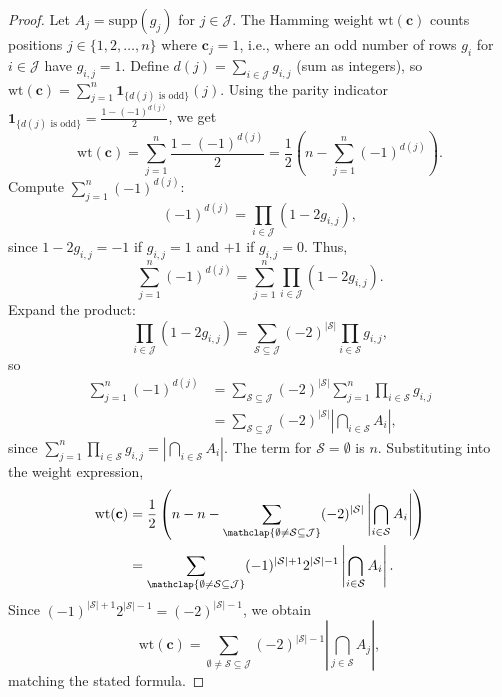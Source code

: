 \documentclass[conference]{IEEEtran}
\theoremstyle{definition}
\begin{document}
\begin{proof}
Let $A_j = \mathrm{supp}(g_j)$ for $j \in \mathcal{J}$. The Hamming weight $\mathrm{wt}(\mathbf{c})$ counts positions $j \in \{1,2,\dots,n\}$ where $\mathbf{c}_j = 1$, i.e., where an odd number of rows $g_i$ for $i \in \mathcal{J}$ have $g_{i,j} = 1$. Define $d(j) = \sum_{i \in \mathcal{J}} g_{i,j}$ (sum as integers), so $\mathrm{wt}(\mathbf{c}) = \sum_{j=1}^n \mathbf{1}_{\{d(j) \text{ is odd}\}}(j)$. Using the parity indicator $\mathbf{1}_{\{d(j) \text{ is odd}\}} = \frac{1 - (-1)^{d(j)}}{2}$, we get
\[
\mathrm{wt}(\mathbf{c}) = \sum_{j=1}^n \frac{1 - (-1)^{d(j)}}{2} = \frac{1}{2} \left( n - \sum_{j=1}^n (-1)^{d(j)} \right).
\]
Compute $\sum_{j=1}^n (-1)^{d(j)}$:
\[
(-1)^{d(j)} = \prod_{i \in \mathcal{J}} (1 - 2 g_{i,j}),
\]
since $1 - 2 g_{i,j} = -1$ if $g_{i,j} = 1$ and $+1$ if $g_{i,j} = 0$. Thus,
\[
\sum_{j=1}^n (-1)^{d(j)} = \sum_{j=1}^n \prod_{i \in \mathcal{J}} (1 - 2 g_{i,j}).
\]
Expand the product:
\[
\prod_{i \in \mathcal{J}} (1 - 2 g_{i,j}) = \sum_{\mathcal{S} \subseteq \mathcal{J}} (-2)^{|\mathcal{S}|} \prod_{i \in \mathcal{S}} g_{i,j},
\]
so
\[
\begin{aligned}
\sum_{j=1}^n (-1)^{d(j)} &= \sum_{\mathcal{S} \subseteq \mathcal{J}} (-2)^{|\mathcal{S}|} \sum_{j=1}^n \prod_{i \in \mathcal{S}} g_{i,j} \\&= \sum_{\mathcal{S} \subseteq \mathcal{J}} (-2)^{|\mathcal{S}|} \left| \bigcap_{i \in \mathcal{S}} A_i \right|,
\end{aligned}
\]
since $\sum_{j=1}^n \prod_{i \in \mathcal{S}} g_{i,j} = |\bigcap_{i \in \mathcal{S}} A_i|$. The term for $\mathcal{S} = \emptyset$ is $n$. Substituting into the weight expression,
\[
\begin{aligned}
\mathrm{wt}(\mathbf{c}) &= \frac{1}{2} \left( n - n - \sum_{\mathclap{\emptyset \neq \mathcal{S} \subseteq \mathcal{J}}} (-2)^{|\mathcal{S}|} \left| \bigcap_{i \in \mathcal{S}} A_i \right| \right) \\&= \sum_{\mathclap{\emptyset \neq \mathcal{S} \subseteq \mathcal{J}}} (-1)^{|\mathcal{S}|+1} 2^{|\mathcal{S}|-1} \left| \bigcap_{i \in \mathcal{S}} A_i \right|.
\end{aligned}
\]
Since $(-1)^{|\mathcal{S}|+1} 2^{|\mathcal{S}|-1} = (-2)^{|\mathcal{S}|-1}$, we obtain
\[
\mathrm{wt}(\mathbf{c}) = \sum_{\emptyset \neq \mathcal{S} \subseteq \mathcal{J}} (-2)^{|\mathcal{S}|-1} \left| \bigcap_{j \in \mathcal{S}} A_j \right|,
\]
matching the stated formula.
\end{proof}
\end{document}
